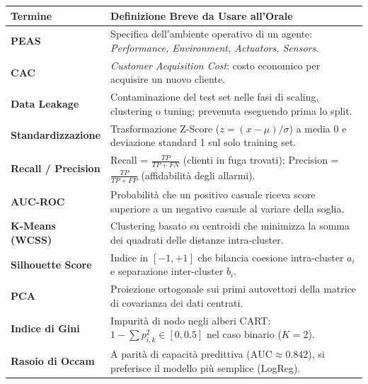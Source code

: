 \documentclass[11pt, a4paper]{article}
\begin{document}
\begin{center}
\setlength{\tabcolsep}{8pt}
\renewcommand{\arraystretch}{1.25}
\begin{tabular}{l p{12cm}}
    \toprule
    \textbf{Termine} & \textbf{Definizione Breve da Usare all'Orale} \\
    \midrule
    \textbf{PEAS} & Specifica dell'ambiente operativo di un agente: \textit{Performance, Environment, Actuators, Sensors}. \\
    \textbf{CAC} & \textit{Customer Acquisition Cost}: costo economico per acquisire un nuovo cliente. \\
    \textbf{Data Leakage} & Contaminazione del test set nelle fasi di scaling, clustering o tuning; prevenuta eseguendo prima lo split. \\
    \textbf{Standardizzazione} & Trasformazione Z-Score ($z=(x-\mu)/\sigma$) a media 0 e deviazione standard 1 sul solo training set. \\
    \textbf{Recall / Precision} & Recall = $\frac{TP}{TP+FN}$ (clienti in fuga trovati); Precision = $\frac{TP}{TP+FP}$ (affidabilità degli allarmi). \\
    \textbf{AUC-ROC} & Probabilità che un positivo casuale riceva score superiore a un negativo casuale al variare della soglia. \\
    \textbf{K-Means (WCSS)} & Clustering basato su centroidi che minimizza la somma dei quadrati delle distanze intra-cluster. \\
    \textbf{Silhouette Score} & Indice in $[-1, +1]$ che bilancia coesione intra-cluster $a_i$ e separazione inter-cluster $b_i$. \\
    \textbf{PCA} & Proiezione ortogonale sui primi autovettori della matrice di covarianza dei dati centrati. \\
    \textbf{Indice di Gini} & Impurità di nodo negli alberi CART: $1-\sum p_{i,k}^2 \in [0, 0.5]$ nel caso binario ($K=2$). \\
    \textbf{Rasoio di Occam} & A parità di capacità predittiva ($\text{AUC} \approx 0.842$), si preferisce il modello più semplice (LogReg). \\
    \bottomrule
\end{tabular}
\end{center}
\end{document}
